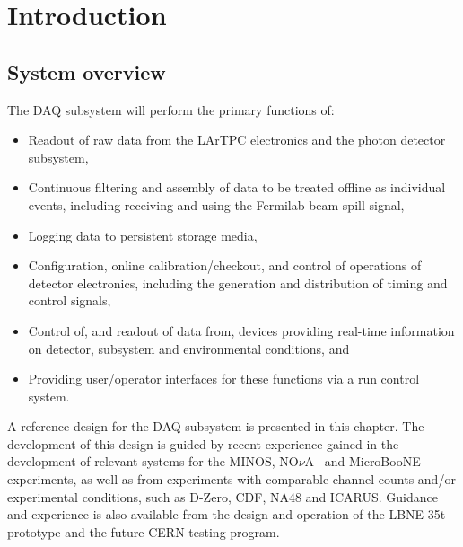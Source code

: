 \section{Introduction}
\label{sec:daq_intro}

\subsection{System overview} 

The DAQ subsystem will perform the primary functions of:

\begin{itemize}
  \item Readout of raw data from the LArTPC electronics and the photon
    detector subsystem,

  \item Continuous filtering and assembly of data to be treated
    offline as individual events, including receiving and using the
    Fermilab beam-spill signal, 

  \item Logging data to persistent storage media,

  \item Configuration, online calibration/checkout, and control of 
        operations of detector electronics, including the generation 
        and distribution of timing and control signals,

  \item Control of, and readout of data from, devices 
        providing real-time information on detector, subsystem 
        and environmental conditions, and  

  \item Providing user/operator interfaces for these functions via 
        a run control system.
\end{itemize}

A reference design for the DAQ subsystem is presented in this chapter.
The development of this design is guided by recent experience gained
in the development of relevant systems for the MINOS,
NO$\nu$A~\cite{novatdr} and MicroBooNE~\cite{microboonecdr}
experiments, as well as from experiments with comparable channel
counts and/or experimental conditions, such as D-Zero, CDF, NA48 and
ICARUS. 
Guidance and experience is also available from the design and
operation of the LBNE 35t prototype 
and the future CERN testing
program.

